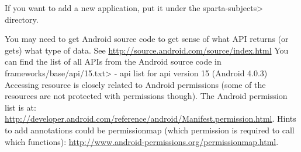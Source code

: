 If you want to add a new application, put it under the
\<sparta-subjects> directory.

You may need to get Android source code to get sense of what API returns (or
gets) what type of data. See \url{http://source.android.com/source/index.html}
You can find the list of all APIs from the Android source code in 
\<frameworks/base/api/15.txt> - api list for api version 15 (Android 4.0.3)
Accessing resource is closely related to Android permissions (some of the
resources are not protected with permissions though).
The Android permission list is at:
\url{http://developer.android.com/reference/android/Manifest.permission.html}.
Hints to add annotations could be permissionmap (which permission is required
to call which functions):
\url{http://www.android-permissions.org/permissionmap.html}.





